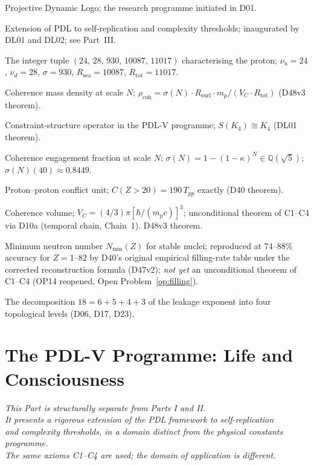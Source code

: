 \documentclass[11pt,a4paper]{article}
\theoremstyle{plain}
\theoremstyle{definition}
\theoremstyle{remark}
\newcommand{\quintuplet}{(24,\,28,\,930,\,10087,\,11017)}
\newcommand{\Rsurf}{R_{\mathrm{surf}}}
\newcommand{\Rtot}{R_{\mathrm{tot}}}
\newcommand{\sigmaN}{\sigma(N)}
\newcommand{\Tpp}{T_{pp}}
\newcommand{\rhocoh}{\rho_{\mathrm{coh}}}
\begin{document}
\begin{description}[leftmargin=3.5cm, style=nextline]
\item[PDL] Projective Dynamic Logo; the research programme initiated in D01.
\item[PDL-V programme] Extension of PDL to self-replication and complexity thresholds; inaugurated by DL01 and DL02; see Part~III.
\item[Quintuplet] The integer tuple $\quintuplet$ characterising the proton; $\nu_u=24$, $\nu_d=28$, $\sigma=930$, $R_{\mathrm{sea}}=10087$, $R_{\mathrm{tot}}=11017$.
\item[$\rhocoh(N)$] Coherence mass density at scale $N$; $\rhocoh = \sigmaN\cdot\Rsurf\cdot m_p/(V_C\cdot\Rtot)$ (D48v3 theorem).
\item[$S(\Gamma)$] Constraint-structure operator in the PDL-V programme; $S(K_4) \cong K_4$ (DL01 theorem).
\item[$\sigmaN(N)$] Coherence engagement fraction at scale $N$; $\sigmaN=1-(1-\kappa)^N\in\mathbb{Q}(\sqrt{5})$; $\sigmaN(40)\approx 0.8449$.
\item[$\Tpp$] Proton--proton conflict unit; $C(Z>20)=190\,\Tpp$ exactly (D40 theorem).
\item[$V_C$] Coherence volume; $V_C=(4/3)\pi[\hbar/(m_pc)]^3$; unconditional theorem of C1--C4 via D10a (temporal chain, Chain~1). D48v3 theorem.
\item[Valley of stability] Minimum neutron number $N_{\min}(Z)$ for stable nuclei; reproduced at $74$--$88\%$ accuracy for $Z=1$--82 by D40's original empirical filling-rate table under the corrected reconstruction formula (D47v2); \emph{not yet} an unconditional theorem of C1--C4 (OP14 reopened, Open Problem~\ref{op:filling}).
\item[18-filter hierarchy] The decomposition $18=6+5+4+3$ of the leakage exponent into four topological levels (D06, D17, D23).
\end{description}

\newpage
\part{The PDL-V Programme: Life and Consciousness}
\label{part:PDL-V}

\begin{center}
\textit{This Part is structurally separate from Parts I and II.\\
It presents a rigorous extension of the PDL framework to self-replication\\
and complexity thresholds, in a domain distinct from the physical constants programme.\\
The same axioms C1--C4 are used; the domain of application is different.}
\end{center}
\end{document}
